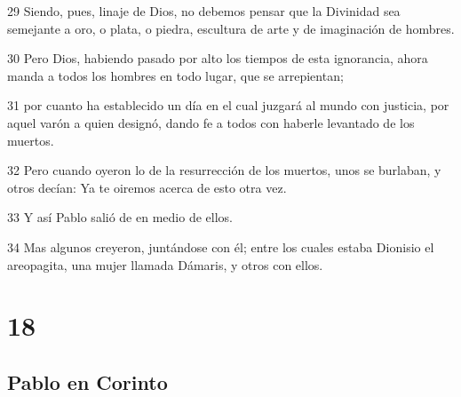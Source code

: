\par 29 Siendo, pues, linaje de Dios, no debemos pensar que la Divinidad sea semejante a oro, o plata, o piedra, escultura de arte y de imaginación de hombres.
\par 30 Pero Dios, habiendo pasado por alto los tiempos de esta ignorancia, ahora manda a todos los hombres en todo lugar, que se arrepientan;
\par 31 por cuanto ha establecido un día en el cual juzgará al mundo con justicia, por aquel varón a quien designó, dando fe a todos con haberle levantado de los muertos.
\par 32 Pero cuando oyeron lo de la resurrección de los muertos, unos se burlaban, y otros decían: Ya te oiremos acerca de esto otra vez.
\par 33 Y así Pablo salió de en medio de ellos.
\par 34 Mas algunos creyeron, juntándose con él; entre los cuales estaba Dionisio el areopagita, una mujer llamada Dámaris, y otros con ellos.

\chapter{18}

\section*{Pablo en Corinto}


